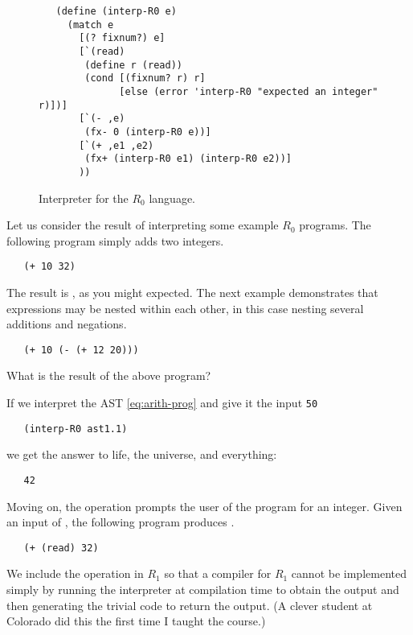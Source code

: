 \documentclass[11pt]{book}
\begin{document}
\begin{figure}[tbp]
\begin{lstlisting}
   (define (interp-R0 e)
     (match e
       [(? fixnum?) e]
       [`(read)
        (define r (read))
        (cond [(fixnum? r) r]
              [else (error 'interp-R0 "expected an integer" r)])]
       [`(- ,e)
        (fx- 0 (interp-R0 e))]
       [`(+ ,e1 ,e2)
        (fx+ (interp-R0 e1) (interp-R0 e2))]
       ))
\end{lstlisting}
\caption{Interpreter for the $R_0$ language.}
\label{fig:interp-R0}
\end{figure}

Let us consider the result of interpreting some example $R_0$
programs. The following program simply adds two integers.
\begin{lstlisting}
   (+ 10 32)
\end{lstlisting}
The result is , as you might expected. 
%
The next example demonstrates that expressions may be nested within
each other, in this case nesting several additions and negations.
\begin{lstlisting}
   (+ 10 (- (+ 12 20)))
\end{lstlisting}
What is the result of the above program?

If we interpret the AST \eqref{eq:arith-prog} and give it the input
\texttt{50}
\begin{lstlisting}
   (interp-R0 ast1.1)
\end{lstlisting}
we get the answer to life, the universe, and everything:
\begin{lstlisting}
   42
\end{lstlisting}

Moving on, the  operation prompts the user of the program
for an integer. Given an input of , the following program
produces .
\begin{lstlisting}
   (+ (read) 32)
\end{lstlisting}
We include the  operation in $R_1$ so that a compiler for
$R_1$ cannot be implemented simply by running the interpreter at
compilation time to obtain the output and then generating the trivial
code to return the output. (A clever student at Colorado did this the
first time I taught the course.)

\end{document}
